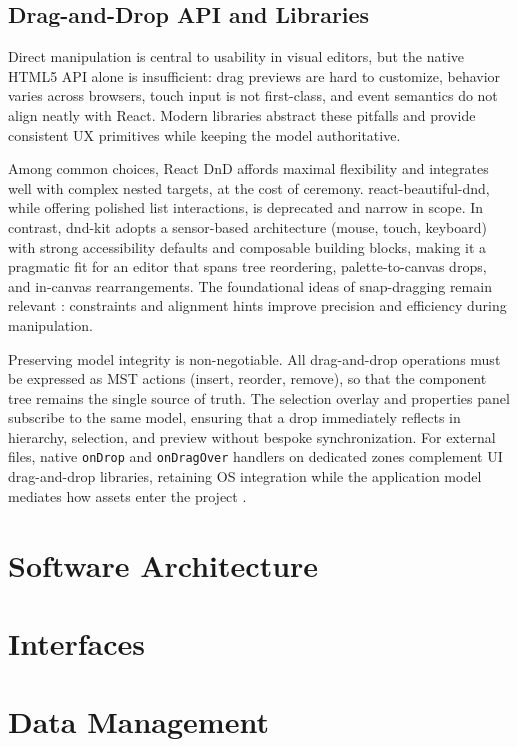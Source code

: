 \documentclass[oneside,12pt]{book}
\begin{document}
\subsection{Drag-and-Drop API and Libraries}
\label{sec:drag-drop-patterns}

Direct manipulation is central to usability in visual editors, but the native HTML5 API alone is insufficient: drag previews are hard to customize, behavior varies across browsers, touch input is not first-class, and event semantics do not align neatly with React. Modern libraries abstract these pitfalls and provide consistent UX primitives while keeping the model authoritative.

Among common choices, React DnD affords maximal flexibility and integrates well with complex nested targets, at the cost of ceremony. react-beautiful-dnd, while offering polished list interactions, is deprecated and narrow in scope. In contrast, dnd-kit adopts a sensor-based architecture (mouse, touch, keyboard) with strong accessibility defaults and composable building blocks, making it a pragmatic fit for an editor that spans tree reordering, palette-to-canvas drops, and in-canvas rearrangements. The foundational ideas of snap-dragging remain relevant \cite{bier1986snap}: constraints and alignment hints improve precision and efficiency during manipulation.

Preserving model integrity is non-negotiable. All drag-and-drop operations must be expressed as MST actions (insert, reorder, remove), so that the component tree remains the single source of truth. The selection overlay and properties panel subscribe to the same model, ensuring that a drop immediately reflects in hierarchy, selection, and preview without bespoke synchronization. For external files, native \texttt{onDrop} and \texttt{onDragOver} handlers on dedicated zones complement UI drag-and-drop libraries, retaining OS integration while the application model mediates how assets enter the project \cite{szyperski1996component}.

\section{Software Architecture}

\section{Interfaces}

\section{Data Management}
\end{document}
